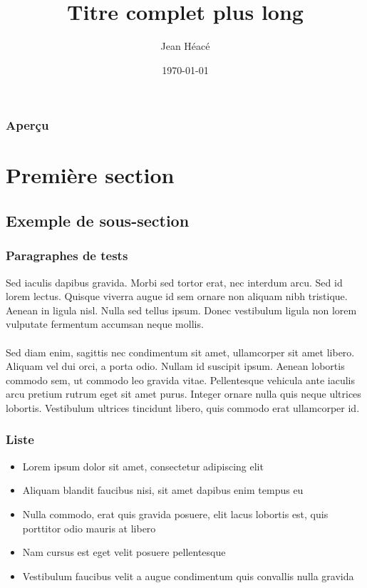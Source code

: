\documentclass{beamer}
\title[Titre court]{Titre complet plus long}
\author{Jean Héacé}
\institute[ulaval] 
{
Université Laval \\ 4
\medskip
\textit{jean.heace.1@ulaval.ca}
}
\date{\today}
\begin{document}
\begin{frame}
\titlepage
\end{frame}

\begin{frame}
\frametitle{Aperçu}
\tableofcontents 
\end{frame}


\section{Première section}

\subsection{Exemple de sous-section}

\begin{frame}
\frametitle{Paragraphes de tests}
Sed iaculis dapibus gravida. Morbi sed tortor erat, nec interdum arcu. Sed id lorem lectus. Quisque viverra augue id sem ornare non aliquam nibh tristique. Aenean in ligula nisl. Nulla sed tellus ipsum. Donec vestibulum ligula non lorem vulputate fermentum accumsan neque mollis.\\~\\

Sed diam enim, sagittis nec condimentum sit amet, ullamcorper sit amet libero. Aliquam vel dui orci, a porta odio. Nullam id suscipit ipsum. Aenean lobortis commodo sem, ut commodo leo gravida vitae. Pellentesque vehicula ante iaculis arcu pretium rutrum eget sit amet purus. Integer ornare nulla quis neque ultrices lobortis. Vestibulum ultrices tincidunt libero, quis commodo erat ullamcorper id.
\end{frame}

\begin{frame}
\frametitle{Liste}
\begin{itemize}
\item Lorem ipsum dolor sit amet, consectetur adipiscing elit
\item Aliquam blandit faucibus nisi, sit amet dapibus enim tempus eu
\item Nulla commodo, erat quis gravida posuere, elit lacus lobortis est, quis porttitor odio mauris at libero
\item Nam cursus est eget velit posuere pellentesque
\item Vestibulum faucibus velit a augue condimentum quis convallis nulla gravida
\end{itemize}
\end{frame}
\end{document}
